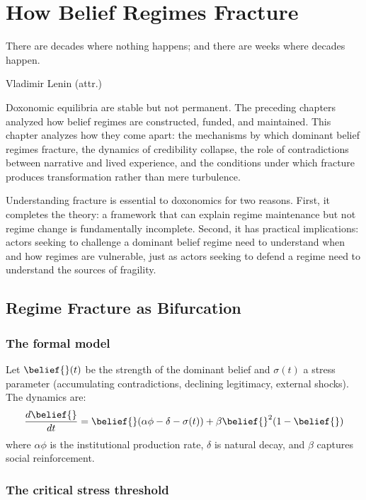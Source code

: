 \chapter{How Belief Regimes Fracture}
\label{ch:how-belief-regimes-fracture}

\epigraph{There are decades where nothing happens; and there are weeks where decades happen.}{Vladimir Lenin (attr.)}

\noindent
Doxonomic equilibria are stable but not permanent.
The preceding chapters analyzed how belief regimes are constructed, funded, and maintained.
This chapter analyzes how they come apart: the mechanisms by which dominant belief regimes fracture, the dynamics of credibility collapse, the role of contradictions between narrative and lived experience, and the conditions under which fracture produces transformation rather than mere turbulence.

Understanding fracture is essential to doxonomics for two reasons.
First, it completes the theory: a framework that can explain regime maintenance but not regime change is fundamentally incomplete.
Second, it has practical implications: actors seeking to challenge a dominant belief regime need to understand when and how regimes are vulnerable, just as actors seeking to defend a regime need to understand the sources of fragility.

\section{Regime Fracture as Bifurcation}
\label{sec:ch30-bifurcation}

\subsection{The formal model}

\begin{model}
\label{mod:bifurcation}
Let $\belief{}(t)$ be the strength of the dominant belief and $\sigma(t)$ a stress parameter (accumulating contradictions, declining legitimacy, external shocks).
The dynamics are:
\[
  \frac{d\belief{}}{dt} = \belief{}(\alpha\phi - \delta - \sigma(t)) + \beta\belief{}^2(1 - \belief{})
\]
where $\alpha\phi$ is the institutional production rate, $\delta$ is natural decay, and $\beta$ captures social reinforcement.
\end{model}

\subsection{The critical stress threshold}

